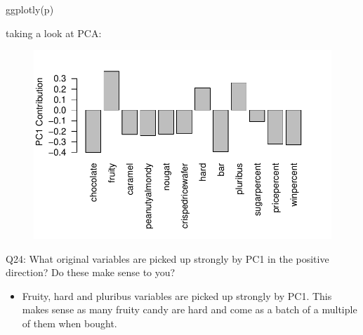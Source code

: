 \documentclass[
  letterpaper,
  DIV=11,
  numbers=noendperiod]{scrartcl}
\newenvironment{Shaded}{\begin{snugshade}}{\end{snugshade}}
\newcommand{\AttributeTok}[1]{\textcolor[rgb]{0.40,0.45,0.13}{#1}}
\newcommand{\DecValTok}[1]{\textcolor[rgb]{0.68,0.00,0.00}{#1}}
\newcommand{\FunctionTok}[1]{\textcolor[rgb]{0.28,0.35,0.67}{#1}}
\newcommand{\NormalTok}[1]{\textcolor[rgb]{0.00,0.23,0.31}{#1}}
\newcommand{\SpecialCharTok}[1]{\textcolor[rgb]{0.37,0.37,0.37}{#1}}
\newcommand{\StringTok}[1]{\textcolor[rgb]{0.13,0.47,0.30}{#1}}
\providecommand{\tightlist}{%
  \setlength{\itemsep}{0pt}\setlength{\parskip}{0pt}}\usepackage{longtable,booktabs,array}
\begin{document}
\begin{Shaded}
\begin{Highlighting}[]
\FunctionTok{ggplotly}\NormalTok{(p)}
\end{Highlighting}
\end{Shaded}

taking a look at PCA:

\begin{Shaded}
\end{Shaded}

\begin{figure}[H]

{\centering \includegraphics{class10_project_files/figure-pdf/unnamed-chunk-26-1.pdf}

}

\end{figure}

Q24: What original variables are picked up strongly by PC1 in the
positive direction? Do these make sense to you?

\begin{itemize}
\tightlist
\item
  Fruity, hard and pluribus variables are picked up strongly by PC1.
  This makes sense as many fruity candy are hard and come as a batch of
  a multiple of them when bought.
\end{itemize}
\end{document}
